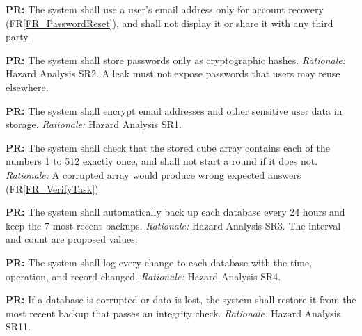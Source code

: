 \documentclass[12pt]{article}
\newcommand{\rref}[1]{FR\ref{#1}}
\newcounter{prnum} %
\begin{document}
\vspace{0.5em}
\noindent {}\label{PR_2}\textbf{PR\theprnum:} The system shall use a user's email address only for account recovery (\rref{FR_PasswordReset}), and shall not display it or share it with any third party.
 
\vspace{0.5em}
\noindent {}\label{PR_3}\textbf{PR\theprnum:} The system shall store passwords only as cryptographic hashes. \newline \textit{Rationale:} Hazard Analysis SR2. A leak must not expose passwords that users may reuse elsewhere.
 
\vspace{0.5em}
\noindent {}\label{PR_4}\textbf{PR\theprnum:} The system shall encrypt email addresses and other sensitive user data in storage. \newline \textit{Rationale:} Hazard Analysis SR1.
 
\vspace{0.5em}
\noindent {}\label{PR_5}\textbf{PR\theprnum:} The system shall check that the stored cube array contains each of the numbers 1 to 512 exactly once, and shall not start a round if it does not. \newline \textit{Rationale:} A corrupted array would produce wrong expected answers (\rref{FR_VerifyTask}).
 
\vspace{0.5em}
\noindent {}\label{PR_6}\textbf{PR\theprnum:} The system shall automatically back up each database every 24 hours and keep the 7 most recent backups. \newline \textit{Rationale:} Hazard Analysis SR3. The interval and count are proposed values.
 
\vspace{0.5em}
\noindent {}\label{PR_7}\textbf{PR\theprnum:} The system shall log every change to each database with the time, operation, and record changed. \newline \textit{Rationale:} Hazard Analysis SR4.
 
\vspace{0.5em}
\noindent {}\label{PR_8}\textbf{PR\theprnum:} If a database is corrupted or data is lost, the system shall restore it from the most recent backup that passes an integrity check. \newline \textit{Rationale:} Hazard Analysis SR11.
 
\end{document}
